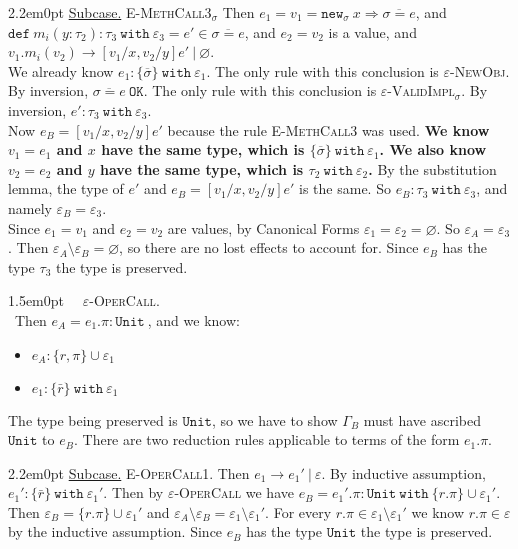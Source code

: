 \documentclass{llncs}
\newcommand{\keywadj}[1]{\mathtt{#1}}
\newcommand{\keyw}[1]{\keywadj{#1}~}
\newcommand{\proofcase}[2]{
	\begin{adjustwidth}{1.5em}{0pt}
		\fbox{Case.}~~#1. \\ ~#2
	\end{adjustwidth}
}
\newcommand{\subcase}[1] {
	\begin{adjustwidth}{2.2em}{0pt}
		\underline{Subcase.} #1
	\end{adjustwidth}
}
\newcommand{\type}[2]{
	#1~\keyw{with} #2
}
\newcommand{\newsig}[0]{
	\keywadj{new}_\sigma~x \Rightarrow \overline{\sigma = e}
}
\begin{document}
{{		\subcase{ \textsc{E-MethCall3$_\sigma$} Then $e_1 = v_1 = \newsig$, and $\keyw{def} m_i(y : \tau_2) : \tau_3~\keyw{with} \varepsilon_3 = e' \in \overline{\sigma = e}$, and $e_2 = v_2$ is a value, and $v_1.m_i(v_2) \longrightarrow [v_1/x, v_2/y]e'~|~\varnothing$. \\
	
	\noindent	
We already know $e_1  : \{ \overline \sigma \}~ \keyw{with} \varepsilon_1$. The only rule with this conclusion is \textsc{$\varepsilon$-NewObj}. By inversion, $\overline{ \sigma = e }~\keywadj{OK}$. The only rule with this conclusion is \textsc{$\varepsilon$-ValidImpl$_{\sigma}$}. By inversion, $e' : \tau_3~\keyw{with} \varepsilon_3$. \\

		\noindent
Now $e_B = [v_1/x, v_2/y]e'$ because the rule \textsc{E-MethCall3} was used. \textbf{We know $v_1 = e_1$ and $x$ have the same type, which is $\{ \overline \sigma \}~ \keyw{with} \varepsilon_1$. We also know $v_2 = e_2$ and $y$ have the same type, which is $\tau_2~\keyw{with} \varepsilon_2$.} By the substitution lemma, the type of $e'$ and $e_B = [v_1/x, v_2/y]e'$ is the same. So $e_B : \tau_3~\keyw{with} \varepsilon_3$, and namely $\varepsilon_B = \varepsilon_3$.\\

		\noindent
Since $e_1 = v_1$ and $e_2 = v_2$ are values, by Canonical Forms $\varepsilon_1 = \varepsilon_2 = \varnothing$. So $\varepsilon_A = \varepsilon_3$. Then $\varepsilon_A \setminus \varepsilon_B = \varnothing$, so there are no lost effects to account for. Since $e_B$ has the type $\tau_3$ the type is preserved.
\\ }
}


	\proofcase{\textsc{$\varepsilon$-OperCall}} {Then $e_A = e_1.\pi : \keyw{Unit}$, and we know:
	\begin{itemize}
		\item $e_A :  \{ r, \pi \} \cup \varepsilon_1$
		\item $e_1 : \{ \bar r \}~\keyw{with} \varepsilon_1$
	\end{itemize}
The type being preserved is $\keywadj{Unit}$, so we have to show $\Gamma_B$ must have ascribed $\keywadj{Unit}$ to $e_B$. There are two reduction rules applicable to terms of the form $e_1.\pi$. 

	\subcase { \textsc{E-OperCall1}. Then $e_1 \longrightarrow e_1'~|~\varepsilon$. By inductive assumption, $e_1' : \{ \bar r \} ~ \keyw{with} \varepsilon_1'$. Then by \textsc{$\varepsilon$-OperCall} we have $e_B = e_1'.\pi : \type{ \keywadj{Unit} }{\{r.\pi\} \cup \varepsilon_1'}$. Then $\varepsilon_B = \{ r.\pi \} \cup \varepsilon_1'$ and $\varepsilon_A \setminus \varepsilon_B = \varepsilon_1 \setminus \varepsilon_1'$. For every $r.\pi \in \varepsilon_1 \setminus \varepsilon_1'$ we know $r.\pi \in \varepsilon$ by the inductive assumption. Since $e_B$ has the type $\keywadj{Unit}$ the type is preserved.
	}
	
}}
\end{document}
